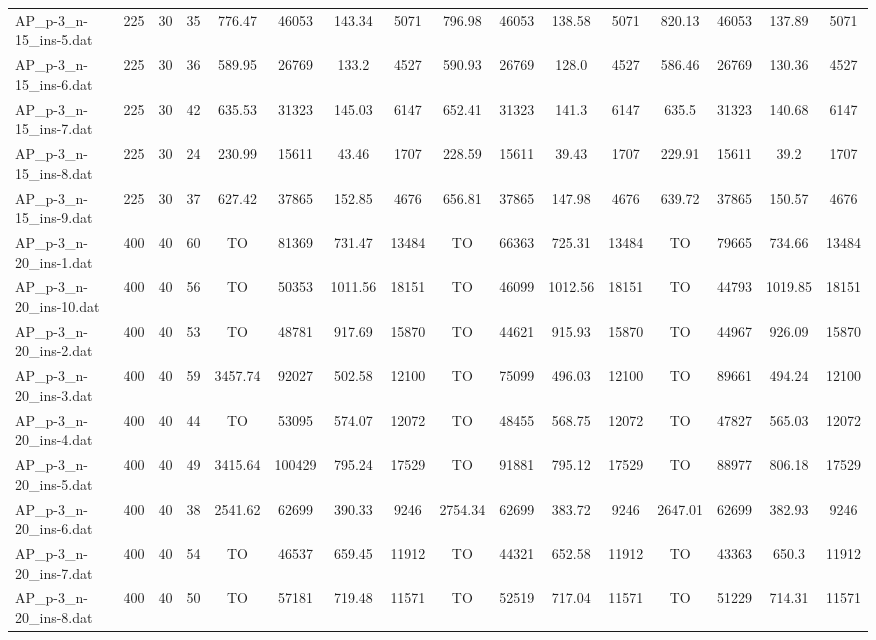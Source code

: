 \begin{sidewaystable}[!ht]
{\begin{tabular}{lccccccccccccccc}
AP\_p-3\_n-15\_ins-5.dat & 225 & 30 & 35 & 776.47 & 46053 & 143.34 & 5071 & 796.98 & 46053 & 138.58 & 5071 & 820.13 & 46053 & 137.89 & 5071 \\
AP\_p-3\_n-15\_ins-6.dat & 225 & 30 & 36 & 589.95 & 26769 & 133.2 & 4527 & 590.93 & 26769 & 128.0 & 4527 & 586.46 & 26769 & 130.36 & 4527 \\
AP\_p-3\_n-15\_ins-7.dat & 225 & 30 & 42 & 635.53 & 31323 & 145.03 & 6147 & 652.41 & 31323 & 141.3 & 6147 & 635.5 & 31323 & 140.68 & 6147 \\
AP\_p-3\_n-15\_ins-8.dat & 225 & 30 & 24 & 230.99 & 15611 & 43.46 & 1707 & 228.59 & 15611 & 39.43 & 1707 & 229.91 & 15611 & 39.2 & 1707 \\
AP\_p-3\_n-15\_ins-9.dat & 225 & 30 & 37 & 627.42 & 37865 & 152.85 & 4676 & 656.81 & 37865 & 147.98 & 4676 & 639.72 & 37865 & 150.57 & 4676 \\
AP\_p-3\_n-20\_ins-1.dat & 400 & 40 & 60 &  TO & 81369 & 731.47 & 13484 &  TO & 66363 & 725.31 & 13484 &  TO & 79665 & 734.66 & 13484 \\
AP\_p-3\_n-20\_ins-10.dat & 400 & 40 & 56 &  TO & 50353 &  \textcolor{blue2}{1011.56} & 18151 &  TO & 46099 & 1012.56 & 18151 &  TO & 44793 & 1019.85 & 18151 \\
AP\_p-3\_n-20\_ins-2.dat & 400 & 40 & 53 &  TO & 48781 & 917.69 & 15870 &  TO & 44621 &  \textcolor{blue2}{915.93} & 15870 &  TO & 44967 & 926.09 & 15870 \\
AP\_p-3\_n-20\_ins-3.dat & 400 & 40 & 59 & 3457.74 & 92027 & 502.58 & 12100 &  TO & 75099 & 496.03 & 12100 &  TO & 89661 &  \textcolor{blue2}{494.24} & 12100 \\
AP\_p-3\_n-20\_ins-4.dat & 400 & 40 & 44 &  TO & 53095 & 574.07 & 12072 &  TO & 48455 & 568.75 & 12072 &  TO & 47827 & 565.03 & 12072 \\
AP\_p-3\_n-20\_ins-5.dat & 400 & 40 & 49 & 3415.64 & 100429 & 795.24 & 17529 &  TO & 91881 &  \textcolor{blue2}{795.12} & 17529 &  TO & 88977 & 806.18 & 17529 \\
AP\_p-3\_n-20\_ins-6.dat & 400 & 40 & 38 & 2541.62 & 62699 & 390.33 & 9246 & 2754.34 & 62699 & 383.72 & 9246 & 2647.01 & 62699 &  \textcolor{blue2}{382.93} & 9246 \\
AP\_p-3\_n-20\_ins-7.dat & 400 & 40 & 54 &  TO & 46537 & 659.45 & 11912 &  TO & 44321 & 652.58 & 11912 &  TO & 43363 & 650.3 & 11912 \\
AP\_p-3\_n-20\_ins-8.dat & 400 & 40 & 50 &  TO & 57181 & 719.48 & 11571 &  TO & 52519 & 717.04 & 11571 &  TO & 51229 & 714.31 & 11571 \\

\end{tabular}}
\end{sidewaystable}
